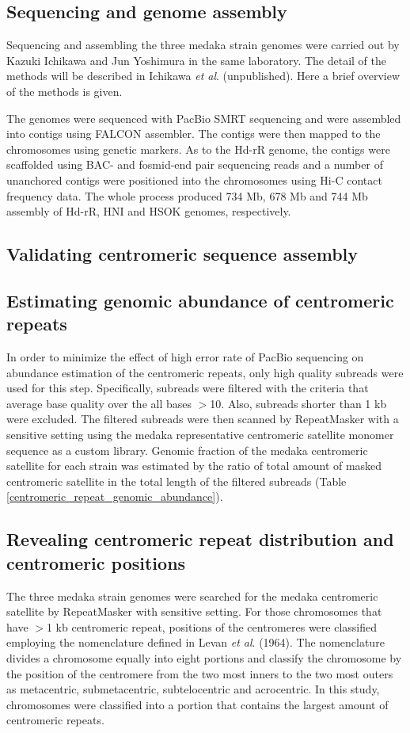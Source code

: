 \subsection*{Sequencing and genome assembly}
Sequencing and assembling the three medaka strain genomes were carried out by Kazuki Ichikawa and Jun Yoshimura in the same laboratory. The detail of the methods will be described in Ichikawa \textit{et al}. (unpublished). Here a brief overview of the methods is given.

The genomes were sequenced with PacBio SMRT sequencing and were assembled into contigs using FALCON assembler. The contigs were then mapped to the chromosomes using genetic markers. As to the Hd-rR genome, the contigs were scaffolded using BAC- and fosmid-end pair sequencing reads and a number of unanchored contigs were positioned into the chromosomes using Hi-C contact frequency data. The whole process produced 734 Mb, 678 Mb and 744 Mb assembly of Hd-rR, HNI and HSOK genomes, respectively.

\subsection*{Validating centromeric sequence assembly}


\subsection*{Estimating genomic abundance of centromeric repeats}
In order to minimize the effect of high error rate of PacBio sequencing on abundance estimation of the centromeric repeats, only high quality subreads were used for this step. Specifically, subreads were filtered with the criteria that average base quality over the all bases $>$10. Also, subreads shorter than 1 kb were excluded. The filtered subreads were then scanned by RepeatMasker with a sensitive setting using the medaka representative centromeric satellite monomer sequence as a custom library. Genomic fraction of the medaka centromeric satellite for each strain was estimated by the ratio of total amount of masked centromeric satellite in the total length of the filtered subreads (Table \ref{centromeric_repeat_genomic_abundance}).

\subsection*{Revealing centromeric repeat distribution and centromeric positions}
The three medaka strain genomes were searched for the medaka centromeric satellite by RepeatMasker with sensitive setting. For those chromosomes that have $>$1 kb centromeric repeat, positions of the centromeres were classified employing the nomenclature defined in Levan \textit{et al}. (1964). The nomenclature divides a chromosome equally into eight portions and classify the chromosome by the position of the centromere from the two most inners to the two most outers as metacentric, submetacentric, subtelocentric and acrocentric. In this study, chromosomes were classified into a portion that contains the largest amount of centromeric repeats.

